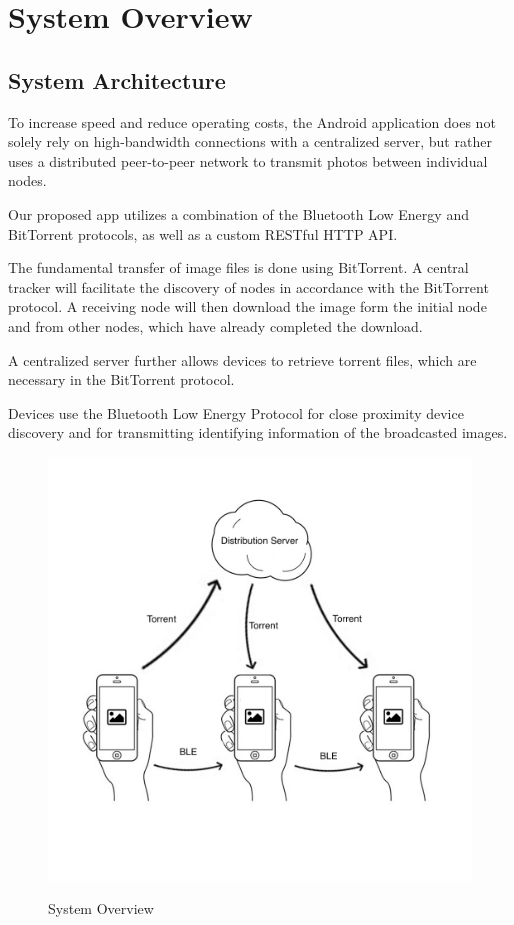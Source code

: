 \documentclass{report}
\newcommand{\lfig}[1]{\label{fig:#1}}
\begin{document}
\section{System Overview}

\subsection{System Architecture}
To increase speed and reduce operating costs, the Android application does not solely rely on high-bandwidth connections with a centralized server, but rather uses a distributed peer-to-peer network to transmit photos between individual nodes.

Our proposed app utilizes a combination of the Bluetooth Low Energy and BitTorrent protocols, as well as a custom RESTful HTTP API.

The fundamental transfer of image files is done using BitTorrent. A central tracker will facilitate the discovery of nodes in accordance with the BitTorrent protocol. A receiving node will then download the image form the initial node and from other nodes, which have already completed the download.

A centralized server further allows devices to retrieve torrent files, which are necessary in the BitTorrent protocol.

Devices use the Bluetooth Low Energy Protocol for close proximity device discovery and for transmitting identifying information of  the broadcasted images.

\begin{figure}[h]
	\centering
    \includegraphics[width=\columnwidth]{overview.jpg}
    \lfig{system-overview}
    \vspace{-5mm} %
	\caption{System Overview}
\end{figure}
\end{document}
